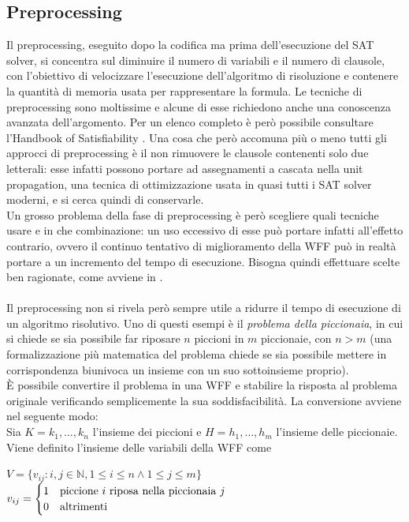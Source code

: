 \subsection{Preprocessing}
Il preprocessing, eseguito dopo la codifica ma prima dell'esecuzione del SAT solver, si concentra sul diminuire il numero di variabili e il 
numero di clausole, con l'obiettivo di velocizzare l'esecuzione dell'algoritmo di risoluzione e contenere la quantità di memoria usata per 
rappresentare la formula.
Le tecniche di preprocessing sono moltissime e alcune di esse richiedono anche una conoscenza avanzata dell'argomento.
Per un elenco completo è però possibile consultare l'Handbook of Satisfiability \cite{handbook-preprocessing}.
Una cosa che però accomuna più o meno tutti gli approcci di preprocessing è il non rimuovere le clausole contenenti 
solo due letterali: esse infatti possono portare ad assegnamenti a cascata nella unit propagation, una tecnica di ottimizzazione usata in quasi tutti i SAT solver moderni, e si cerca quindi di conservarle.\\
Un grosso problema della fase di preprocessing è però scegliere quali tecniche usare e in che combinazione: un uso eccessivo di esse
può portare infatti all'effetto contrario, ovvero il continuo tentativo di miglioramento della WFF può in realtà portare 
a un incremento del tempo di esecuzione.
Bisogna quindi effettuare scelte ben ragionate, come avviene in \cite{preprocessing-choose}.\\
\\
Il preprocessing non si rivela però sempre utile a ridurre il tempo di esecuzione di un algoritmo risolutivo.
Uno di questi esempi è il \textit{problema della piccionaia}, in cui si chiede se sia possibile far riposare
$n$ piccioni in $m$ piccionaie, con $n > m$ (una formalizzazione più matematica del problema chiede se sia 
possibile mettere in corrispondenza biunivoca un insieme con un suo sottoinsieme proprio).\\
È possibile convertire il problema in una WFF e stabilire la risposta al problema originale
verificando semplicemente la sua soddisfacibilità.
La conversione avviene nel seguente modo:\\
Sia $K = {k_1, \ldots, k_n}$ l'insieme dei piccioni e $H = {h_1, \ldots, h_m}$ l'insieme delle piccionaie.
Viene definito l'insieme delle variabili della WFF come 
\begin{center}
    $V = \{v_{ij} : i, j \in \mathbb{N}, 1 \le i \le n \land 1 \le j \le m\}$\\
    $v_{ij} = \begin{cases}
        1 & \textnormal{piccione $i$ riposa nella piccionaia $j$}\\
        0 & \textnormal{altrimenti}
    \end{cases}$
\end{center}
